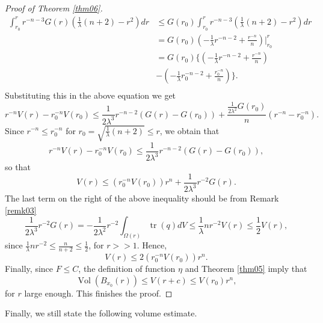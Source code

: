 \documentclass{amsart}
\theoremstyle{plain}
\numberwithin{equation}{section}
\begin{document}
\begin{proof}[Proof of Theorem \ref{thm06}]
\begin{align*}
    \int_{r_0}^{r}r^{-n-3}G(r)\left(\frac{1}{\lambda}(n+2)-r^2\right)dr & \leq G(r_0) \int_{r_0}^{r}r^{-n-3}\left(\frac{1}{\lambda}(n+2)-r^2\right)dr \\
    & = G(r_0)\left( -\frac{1}{\lambda}r^{-n-2}+\frac{r^{-n}}{n}   \right)\bigg|_{r_0}^r \\
    & = G(r_0) \Biggl\{ \left( -\frac{1}{\lambda}r^{-n-2}+\frac{r^{-n}}{n} \right) \\ & - \left( -\frac{1}{\lambda}r_{0}^{-n-2} + \frac{r_{0}^{-n}}{n}  \right)  \Biggr\}. \\
\end{align*}
Substituting this in the above equation we get
$$r^{-n}V(r)-r_{0}^{-n}V(r_0)\leq \frac{1}{2\lambda^3}r^{-n-2}(G(r)-G(r_0)) + \frac{\frac{1}{2\lambda^2}G(r_0)}{n}(r^{-n}-r^{-n}_{0}).$$
Since $r^{-n}\leq r_0^{-n}$ for $r_0=\sqrt{\frac{1}{\lambda}(n+2)}\leq r$, we obtain that
$$r^{-n}V(r)-r_{0}^{-n}V(r_0)\leq \frac{1}{2\lambda^3}r^{-n-2}(G(r)-G(r_0)),$$
so that
$$V(r)\leq (r_{0}^{-n}V(r_0))r^n+\frac{1}{2\lambda^3}r^{-2}G(r).$$
The last term on the right of the above inequality should be from Remark \ref{remk03}
\begin{equation}\label{eq10}
\frac{1}{2\lambda^3}r^{-2}G(r)=-\frac{1}{2\lambda^2}r^{-2}\int_{\Omega(r)}\operatorname{tr}(q)dV\leq\frac{1}{\lambda}nr^{-2}V(r)\leq \frac{1}{2} V(r),
\end{equation}
since $\frac{1}{\lambda}nr^{-2}\leq\frac{n}{n+2}\leq\frac{1}{2}$,
for $r>>1$. Hence,
$$V(r)\leq 2(r_{0}^{-n}V(r_0))r^n.$$
Finally, since $F\leq C$, the definition of function $\eta$ and Theorem \ref{thm05} imply that
\begin{equation}
     \operatorname{Vol}\left( B_{x_0}(r)  \right) \leq V(r+c) \leq V(r_0)r^{n},
 \end{equation}
 for $r$ large enough. This finishes the proof.
\end{proof}


Finally, we still state the following volume estimate.
\end{document}

